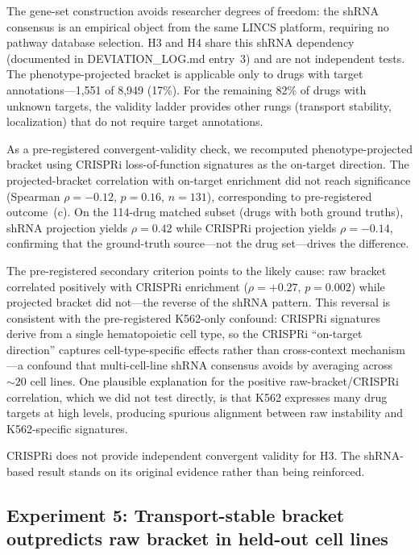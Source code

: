 \documentclass[11pt]{article}
\begin{document}
The gene-set construction avoids researcher degrees of freedom: the shRNA
consensus is an empirical object from the same LINCS platform,
requiring no pathway database selection. H3 and H4 share this shRNA
dependency (documented in DEVIATION\_LOG.md entry~3) and are not
independent tests. The phenotype-projected bracket is applicable only
to drugs with target annotations---1{,}551 of 8{,}949 (17\%). For the
remaining 82\% of drugs with unknown targets, the validity ladder
provides other rungs (transport stability, localization) that do not
require target annotations.

As a pre-registered convergent-validity check, we recomputed
phenotype-projected bracket using CRISPRi loss-of-function signatures
\citep{replogle2022mapping} as the on-target
direction. The projected-bracket correlation with on-target enrichment
did not reach significance (Spearman $\rho = -0.12$, $p = 0.16$,
$n = 131$), corresponding to pre-registered outcome~(c). On the
114-drug matched subset (drugs with both ground truths), shRNA
projection yields $\rho = 0.42$ while CRISPRi projection yields
$\rho = -0.14$, confirming that the ground-truth source---not the
drug set---drives the difference.

The pre-registered secondary criterion points to the likely cause: raw
bracket correlated positively with CRISPRi enrichment
($\rho = +0.27$, $p = 0.002$) while projected bracket did not---the
reverse of the shRNA pattern. This reversal is consistent with the
pre-registered K562-only confound: CRISPRi signatures derive from a
single hematopoietic cell type, so the CRISPRi ``on-target direction''
captures cell-type-specific effects rather than cross-context
mechanism---a confound that multi-cell-line shRNA consensus avoids by
averaging across ${\sim}20$ cell lines. One plausible explanation for
the positive raw-bracket/CRISPRi correlation, which we did not test
directly, is that K562 expresses many drug targets at high levels,
producing spurious alignment between raw instability and K562-specific
signatures.

CRISPRi does not provide independent convergent validity for H3. The
shRNA-based result stands on its original evidence rather than being
reinforced.

\subsection{Experiment 5: Transport-stable bracket outpredicts raw bracket in held-out cell lines}
\end{document}
